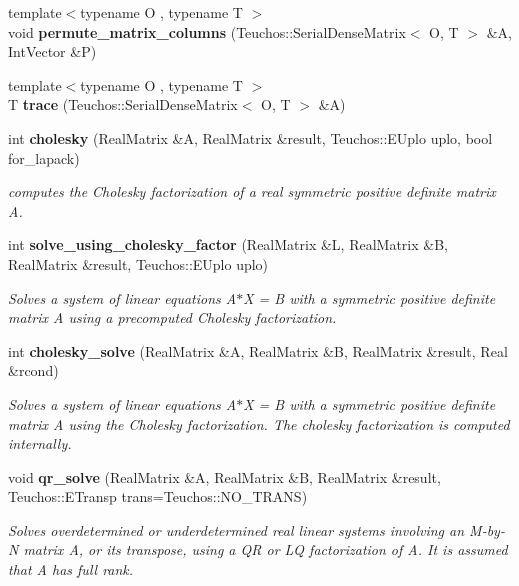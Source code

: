 \begin{DoxyCompactItemize}
\item 
{\footnotesize template$<$typename O , typename T $>$ }\\void {\bfseries permute\+\_\+matrix\+\_\+columns} (Teuchos\+::\+Serial\+Dense\+Matrix$<$ O, T $>$ \&A, Int\+Vector \&P)\label{LinearAlgebra_8hpp_a82e0dd294478bdab3928e72ef6405a33}

\item 
{\footnotesize template$<$typename O , typename T $>$ }\\T {\bfseries trace} (Teuchos\+::\+Serial\+Dense\+Matrix$<$ O, T $>$ \&A)\label{LinearAlgebra_8hpp_a41ccb51366e4c96da7a48dc1eaf5c3b9}

\item 
int {\bfseries cholesky} (Real\+Matrix \&A, Real\+Matrix \&result, Teuchos\+::\+E\+Uplo uplo, bool for\+\_\+lapack)
\begin{DoxyCompactList}\small\item\em computes the Cholesky factorization of a real symmetric positive definite matrix A. \end{DoxyCompactList}\item 
int {\bfseries solve\+\_\+using\+\_\+cholesky\+\_\+factor} (Real\+Matrix \&L, Real\+Matrix \&B, Real\+Matrix \&result, Teuchos\+::\+E\+Uplo uplo)
\begin{DoxyCompactList}\small\item\em Solves a system of linear equations A$\ast$X = B with a symmetric positive definite matrix A using a precomputed Cholesky factorization. \end{DoxyCompactList}\item 
int {\bfseries cholesky\+\_\+solve} (Real\+Matrix \&A, Real\+Matrix \&B, Real\+Matrix \&result, Real \&rcond)
\begin{DoxyCompactList}\small\item\em Solves a system of linear equations A$\ast$X = B with a symmetric positive definite matrix A using the Cholesky factorization. The cholesky factorization is computed internally. \end{DoxyCompactList}\item 
void {\bfseries qr\+\_\+solve} (Real\+Matrix \&A, Real\+Matrix \&B, Real\+Matrix \&result, Teuchos\+::\+E\+Transp trans=Teuchos\+::\+N\+O\+\_\+\+T\+R\+A\+NS)
\begin{DoxyCompactList}\small\item\em Solves overdetermined or underdetermined real linear systems involving an M-\/by-\/N matrix A, or its transpose, using a QR or LQ factorization of A. It is assumed that A has full rank. \end{DoxyCompactList}\item 

\end{DoxyCompactItemize}
